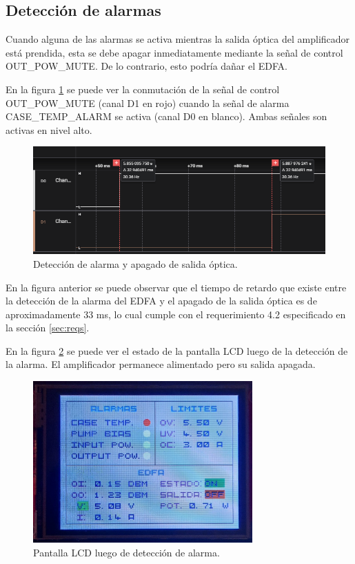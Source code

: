 \subsection{Detección de alarmas}

Cuando alguna de las alarmas se activa mientras la salida óptica del amplificador está prendida, esta se debe apagar inmediatamente mediante la señal de control OUT\_POW\_MUTE. De lo contrario, esto podría dañar el EDFA.

En la figura \ref{fig:detecAlarm2} se puede ver la conmutación de la señal de control OUT\_POW\_MUTE (canal D1 en rojo) cuando la señal de alarma CASE\_TEMP\_ALARM se activa (canal D0 en blanco). Ambas señales son activas en nivel alto.

\begin{figure}[H]
\centering
\includegraphics[width=1\textwidth]{./Figures/detecAlarm2.png}
\caption{Detección de alarma y apagado de salida óptica.}
\label{fig:detecAlarm2}
\end{figure}

En la figura anterior se puede observar que el tiempo de retardo que existe entre la detección de la alarma del EDFA y el apagado de la salida óptica es de aproximadamente 33 ms, lo cual cumple con el requerimiento 4.2 especificado en la sección \ref{sec:reqs}.

En la figura \ref{fig:detecAlarm} se puede ver el estado de la pantalla LCD luego de la detección de la alarma. El amplificador permanece alimentado pero su salida apagada.

\begin{figure}[H]
\centering
\includegraphics[width=0.75\textwidth]{./Figures/detecAlarm.jpg}
\caption{Pantalla LCD luego de detección de alarma.}
\label{fig:detecAlarm}
\end{figure}

